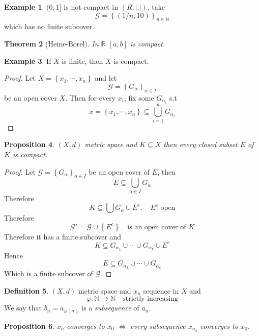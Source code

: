 \documentclass[11pt,a4paper]{article}
\theoremstyle{definition}
\newtheorem{definition}{Definition}[section]
\newtheorem{example}[definition]{Example}
\theoremstyle{plain}
\newtheorem{theorem}[definition]{Theorem}
\newtheorem{proposition}[definition]{Proposition}
\theoremstyle{remark}
\newcommand{\R}{\mathbb{R}}
\newcommand{\N}{\mathbb{N}}
\renewcommand{\set}[1]{\left\{ #1 \right\}}
\newcommand{\abs}[1]{\lvert #1 \rvert}
\begin{document}
\begin{example}
    $(0, 1]$ is not compact in $(R, \abs{.})$, take 
    $$\mathcal{G} = \set{(1/n, 10)}_{n \in \N}$$
    which has no finite subcover. 
\end{example}

\begin{theorem}[Heine-Borel]
    In $\R$ $[a,b]$ is compact.
\end{theorem}

\begin{example}
    If $X$ is finite, then $X$ is compact. 
\end{example}

\begin{proof}
    Let $X = \set{x_1, \cdots, x_n}$ and let 
    $$\mathcal{G} = \set{G_\alpha}_{\alpha \in I}$$
    be an open cover $X$. Then for every $x_i$, fix some $G_{\alpha_i}$ s.t 
    $$x = \set{x_1, \cdots, x_n} \subseteq \bigcup_{i=1}^n G_{\alpha_i}$$
\end{proof}

\begin{proposition}
    $(X, d)$ metric space and $K \subseteq X$ then every closed subset $E$ of $K$ is compact. 
\end{proposition}

\begin{proof}
    Let $\mathcal{G} = \set{G_\alpha}_{\alpha \in I}$ be an open cover of $E$, then 
    $$E \subseteq \bigcup_{\alpha \in I} G_\alpha$$
    Therefore 
    $$K \subseteq \bigcup G_\alpha \cup E^c, \quad \text{$E^c$ open}$$
    Therefore 
    $$\mathcal{G'} = \mathcal{G} \cup \set{E^c} \quad \text{is an open cover of $K$}$$
    Therefore it has a finite subcover and 
    $$K \subseteq G_{\alpha_1} \cup \cdots \cup G_{\alpha_k} \cup E^c$$
    Hence 
    $$E \subseteq G_{\alpha_1} \cup \cdots \cup G_{\alpha_k}$$
    Which is a finite subcover of $\mathcal{G}$. 
\end{proof}

\begin{definition}
    $(X,d)$ metric space and $x_n$ sequence in $X$ and 
    $$\varphi \colon \N \to \N \quad \text{strictly increasing}$$
    We say that $b_n = a_{\varphi(n)}$ is a \emph{subsequence} of $a_n$. 
\end{definition}

\begin{proposition}
    $x_n$ converges to $x_0$ $\iff$ every subsequence $x_{n_k}$ converges to $x_0$. 
\end{proposition}
\end{document}
